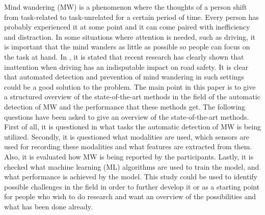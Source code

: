 Mind wandering (MW) is a phenomenon where the thoughts of a person shift from task-related to task-unrelated for a certain period of time. Every person has probably experienced it at some point and it can come paired with inefficiency and distraction. In some situations where attention is needed, such as driving, it is important that the mind wanders as little as possible so people can focus on the task at hand. In \cite{berthie2015restless}, it is stated that recent research has clearly shown that inattention when driving has an indisputable impact on road safety. It is clear that automated detection and prevention of mind wandering in such settings could be a good solution to the problem. The main point in this paper is to give a structured overview of the state-of-the-art methods in the field of the automatic detection of MW and the performance that these methods get. The following questions have been asked to give an overview of the state-of-the-art methods. First of all, it is questioned in what tasks the automatic detection of MW is being utilized. Secondly, it is questioned what modalities are used, which sensors are used for recording these modalities and what features are extracted from them. Also, it is evaluated how MW is being reported by the participants. Lastly, it is checked what machine learning (ML) algorithms are used to train the model, and what performance is achieved by the model. This study could be used to identify possible challenges in the field in order to further develop it or as a starting point for people who wish to do research and want an overview of the possibilities and what has been done already.